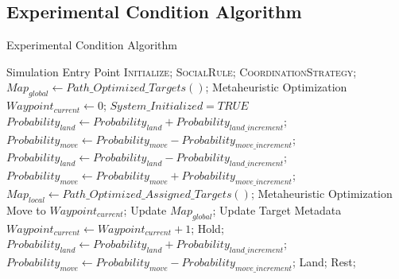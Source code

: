 \documentclass{report}
\begin{document}
\begin{appendices}
\chapter{Experimental Condition Algorithm}
\begin{algorithm}
	\caption{Experimental Condition Algorithm}
	\label{alg:exp_algo}
	\begin{algorithmic}[1]
		 {} \Comment Simulation Entry Point
				\State \textsc{Initialize};
				\State \textsc{SocialRule};
				\State \textsc{CoordinationStrategy};
			\EndWhile
		\EndProcedure
		\\
				\State $Map_{global} \gets Path\_Optimized\_Targets()$; \Comment Metaheuristic Optimization
				\State $Waypoint_{current} \gets 0$;
				\State $System\_Initialized = TRUE$
			\EndIf
		\EndProcedure
		\\
					\State $Probability_{land} \gets Probability_{land} + Probability_{land\_increment}$;
					\State $Probability_{move} \gets Probability_{move} - Probability_{move\_increment}$;
					\State $Probability_{land} \gets Probability_{land} - Probability_{land\_increment}$;
					\State $Probability_{move} \gets Probability_{move} + Probability_{move\_increment}$;
				\EndIf
			\EndIf
		\EndProcedure
		\\
				\State $Map_{local} \gets Path\_Optimized\_Assigned\_Targets()$; \Comment Metaheuristic Optimization
				\State Move to $Waypoint_{current}$;
						\State Update $Map_{global}$; \Comment Update Target Metadata
						\State $Waypoint_{current} \gets Waypoint_{current} + 1$;
					\Else
						\State Hold;
					\EndIf
					\State $Probability_{land} \gets Probability_{land} + Probability_{land\_increment}$;
					\State $Probability_{move} \gets Probability_{move} - Probability_{move\_increment}$;
				\EndIf
				\State Land;
			\Else
				\State Rest;
			\EndIf
		\EndProcedure
	\end{algorithmic}
\end{algorithm}


\end{appendices}
\end{document}
